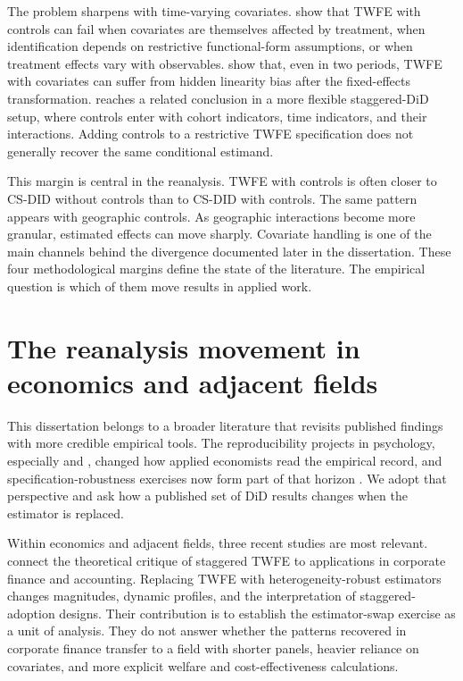 The problem sharpens with time-varying covariates. \textcite{caetano2022difference} show that TWFE with controls can fail when covariates are themselves affected by treatment, when identification depends on restrictive functional-form assumptions, or when treatment effects vary with observables. \textcite{caetano_callaway2024_hiddenlinearity} show that, even in two periods, TWFE with covariates can suffer from hidden linearity bias after the fixed-effects transformation. \textcite{wooldridge2025two} reaches a related conclusion in a more flexible staggered-DiD setup, where controls enter with cohort indicators, time indicators, and their interactions. Adding controls to a restrictive TWFE specification does not generally recover the same conditional estimand.

This margin is central in the reanalysis. TWFE with controls is often closer to CS-DID without controls than to CS-DID with controls. The same pattern appears with geographic controls. As geographic interactions become more granular, estimated effects can move sharply. Covariate handling is one of the main channels behind the divergence documented later in the dissertation. These four methodological margins define the state of the literature. The empirical question is which of them move results in applied work.

\section{The reanalysis movement in economics and adjacent fields}

This dissertation belongs to a broader literature that revisits published findings with more credible empirical tools. The reproducibility projects in psychology, especially \textcite{openscience2015reproducibility} and \textcite{camerer2018evaluating}, changed how applied economists read the empirical record, and specification-robustness exercises now form part of that horizon \parencite{vivalt2020specification}. We adopt that perspective and ask how a published set of DiD results changes when the estimator is replaced.

Within economics and adjacent fields, three recent studies are most relevant. \textcite{baker2022much} connect the theoretical critique of staggered TWFE to applications in corporate finance and accounting. Replacing TWFE with heterogeneity-robust estimators changes magnitudes, dynamic profiles, and the interpretation of staggered-adoption designs. Their contribution is to establish the estimator-swap exercise as a unit of analysis. They do not answer whether the patterns recovered in corporate finance transfer to a field with shorter panels, heavier reliance on covariates, and more explicit welfare and cost-effectiveness calculations.


